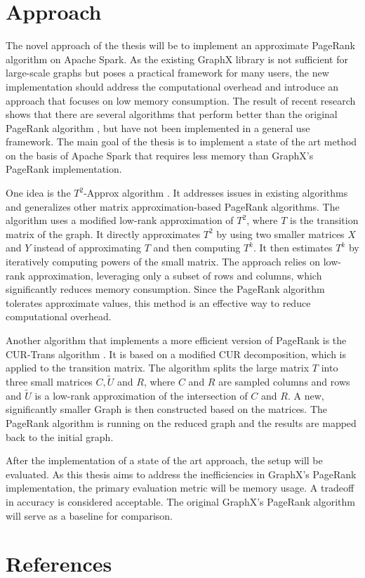 \documentclass[a4paper,12pt]{article}
\begin{document}
\begin{multicols}{2}
\section{Approach}
The novel approach of the thesis will be to implement an approximate PageRank algorithm on Apache Spark. As the existing GraphX library is not sufficient for large-scale graphs but poses a practical framework for many users, the new implementation should address the computational overhead and introduce an approach that focuses on low memory consumption. 
The result of recent research shows that there are several algorithms that perform better than the original PageRank algorithm \cite{wu_efficient_2024}, but have not been implemented in a general use framework. The main goal of the thesis is to implement a state of the art method on the basis of Apache Spark that requires less memory than GraphX's PageRank implementation. 

One idea is the $T^2$-Approx algorithm \cite{wu_efficient_2024}. It addresses issues in existing algorithms and generalizes other matrix approximation-based PageRank algorithms. The algorithm uses a modified low-rank approximation of $T^2$, where $T$ is the transition matrix of the graph. It directly approximates $T^2$ by using two smaller matrices $X$ and $Y$ instead of approximating $T$ and then computing $T^k$. It then estimates $T^k$ by iteratively computing powers of the small matrix. The approach relies on low-rank approximation, leveraging only a subset of rows and columns, which significantly reduces memory consumption. Since the PageRank algorithm tolerates approximate values, this method is an effective way to reduce computational overhead.

Another algorithm that implements a more efficient version of PageRank is the CUR-Trans algorithm \cite{wu_efficient_2024}. It is based on a modified CUR decomposition, which is applied to the transition matrix. The algorithm splits the large matrix $T$ into three small matrices $C, \tilde{U}$ and $R$, where $C$ and $R$ are sampled columns and rows and $\tilde{U}$ is a low-rank approximation of the intersection of $C$ and $R$. A new, significantly smaller Graph is then constructed based on the matrices. The PageRank algorithm is running on the reduced graph and the results are mapped back to the initial graph.

After the implementation of a state of the art approach, the setup will be evaluated. As this thesis aims to address the inefficiencies in GraphX's PageRank implementation, the primary evaluation metric will be memory usage. A tradeoff in accuracy is considered acceptable. The original GraphX's PageRank algorithm will serve as a baseline for comparison. 



\section{References}

\end{multicols}
\end{document}
